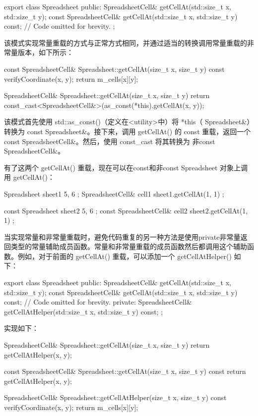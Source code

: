\begin{cpp}
export class Spreadsheet
{
    public:
        SpreadsheetCell& getCellAt(std::size_t x, std::size_t y);
        const SpreadsheetCell& getCellAt(std::size_t x, std::size_t y) const;
        // Code omitted for brevity.
};
\end{cpp}

该模式实现常量重载的方式与正常方式相同，并通过适当的转换调用常量重载的非常量版本，如下所示：

\begin{cpp}
const SpreadsheetCell& Spreadsheet::getCellAt(size_t x, size_t y) const
{
    verifyCoordinate(x, y);
    return m_cells[x][y];
}

SpreadsheetCell& Spreadsheet::getCellAt(size_t x, size_t y)
{
    return const_cast<SpreadsheetCell&>(as_const(*this).getCellAt(x, y));
}
\end{cpp}

该模式首先使用 std::as\_const()（定义在<utility>中）将 *this（ Spreadsheet\&）转换为 const Spreadsheet\&。接下来，调用 getCellAt() 的 const 重载，返回一个 const SpreadsheetCell\&。然后，使用 const\_cast 将其转换为 非const SpreadsheetCell\&。

有了这两个 getCellAt() 重载，现在可以在const和非const Spreadsheet 对象上调用 getCellAt()：

\begin{cpp}
Spreadsheet sheet1 { 5, 6 };
SpreadsheetCell& cell1 { sheet1.getCellAt(1, 1) };

const Spreadsheet sheet2 { 5, 6 };
const SpreadsheetCell& cell2 { sheet2.getCellAt(1, 1) };
\end{cpp}


当实现常量和非常量重载时，避免代码重复的另一种方法是使用private非常量返回类型的常量辅助成员函数。常量和非常量重载的成员函数然后都调用这个辅助函数。例如，对于前面的 getCellAt() 重载，可以添加一个 getCellAtHelper() 如下：

\begin{cpp}
export class Spreadsheet
{
    public:
        SpreadsheetCell& getCellAt(std::size_t x, std::size_t y);
        const SpreadsheetCell& getCellAt(std::size_t x, std::size_t y) const;
        // Code omitted for brevity.
    private:
        SpreadsheetCell& getCellAtHelper(std::size_t x, std::size_t y) const;
};
\end{cpp}

实现如下：

\begin{cpp}
SpreadsheetCell& Spreadsheet::getCellAt(size_t x, size_t y)
{
    return getCellAtHelper(x, y);
}

const SpreadsheetCell& Spreadsheet::getCellAt(size_t x, size_t y) const
{
    return getCellAtHelper(x, y);
}

SpreadsheetCell& Spreadsheet::getCellAtHelper(size_t x, size_t y) const
{
    verifyCoordinate(x, y);
    return m_cells[x][y];
}
\end{cpp}

